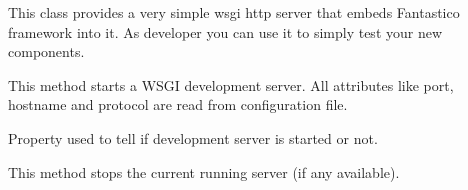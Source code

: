 \documentclass[letterpaper,10pt,english]{sphinxmanual}
\begin{document}
\begin{fulllineitems}
\label{get_started/dev_mode:fantastico.server.dev_server.DevServer}
This class provides a very simple wsgi http server that embeds Fantastico framework into it. As developer you can use
it to simply test your new components.

\begin{fulllineitems}
\label{get_started/dev_mode:fantastico.server.dev_server.DevServer.start}
This method starts a WSGI development server. All attributes like port, hostname and protocol are read from
configuration file.

\end{fulllineitems}


\begin{fulllineitems}
\label{get_started/dev_mode:fantastico.server.dev_server.DevServer.started}
Property used to tell if development server is started or not.

\end{fulllineitems}


\begin{fulllineitems}
\label{get_started/dev_mode:fantastico.server.dev_server.DevServer.stop}
This method stops the current running server (if any available).

\end{fulllineitems}


\end{fulllineitems}
\end{document}
